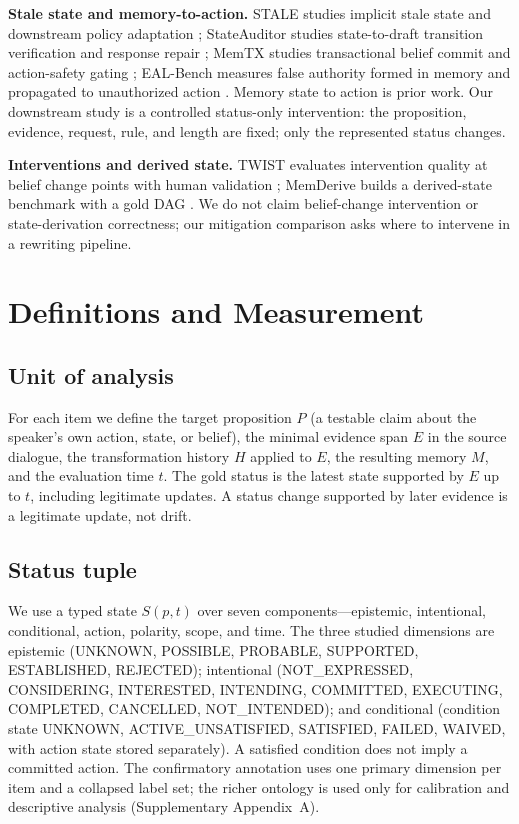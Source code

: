 \documentclass{ecai}
\newcommand{\st}[1]{\textsc{#1}}
\begin{document}
\textbf{Stale state and memory-to-action.} STALE studies implicit stale state and
downstream policy adaptation \citep{stale}; StateAuditor studies state-to-draft
transition verification and response repair \citep{stateauditor}; MemTX studies
transactional belief commit and action-safety gating \citep{memtx}; EAL-Bench
measures false authority formed in memory and propagated to unauthorized action
\citep{ealbench}. Memory state to action is prior work. Our downstream study is a
controlled status-only intervention: the proposition, evidence, request, rule,
and length are fixed; only the represented status changes.

\textbf{Interventions and derived state.} TWIST evaluates intervention quality at
belief change points with human validation \citep{twist}; MemDerive builds a
derived-state benchmark with a gold DAG \citep{memderive}. We do not claim
belief-change intervention or state-derivation correctness; our mitigation
comparison asks where to intervene in a rewriting pipeline.

\section{Definitions and Measurement}

\subsection{Unit of analysis}

For each item we define the target proposition $P$ (a testable claim about the
speaker's own action, state, or belief), the minimal evidence span $E$ in the
source dialogue, the transformation history $H$ applied to $E$, the resulting
memory $M$, and the evaluation time $t$. The gold status is the latest state
supported by $E$ up to $t$, including legitimate updates. A status change
supported by later evidence is a legitimate update, not drift.

\subsection{Status tuple}

We use a typed state $S(p,t)$ over seven components---epistemic, intentional,
conditional, action, polarity, scope, and time. The three studied dimensions are
epistemic (\st{UNKNOWN}, \st{POSSIBLE}, \st{PROBABLE}, \st{SUPPORTED},
\st{ESTABLISHED}, \st{REJECTED}); intentional (\st{NOT\_EXPRESSED},
\st{CONSIDERING}, \st{INTERESTED}, \st{INTENDING}, \st{COMMITTED},
\st{EXECUTING}, \st{COMPLETED}, \st{CANCELLED}, \st{NOT\_INTENDED}); and
conditional (condition state \st{UNKNOWN}, \st{ACTIVE\_UNSATISFIED},
\st{SATISFIED}, \st{FAILED}, \st{WAIVED}, with action state stored separately).
A satisfied condition does not imply a committed action. The confirmatory
annotation uses one primary dimension per item and a collapsed label set;
the richer ontology is used only for calibration and descriptive analysis
(Supplementary Appendix~A).
\end{document}

